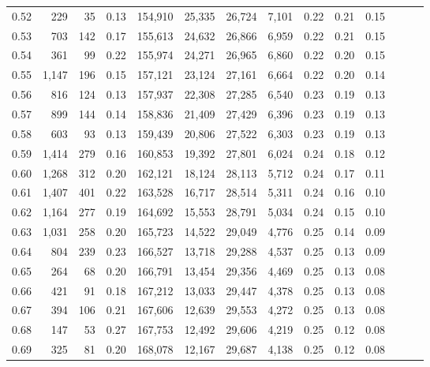 \begin{tabular}{rrrrrrrrrrrrrr}
0.52 &     229 &     35 &  0.13 &  154,910 &   25,335 &  26,724 &   7,101 &  0.22 &  0.21 &      0.15 \\
0.53 &     703 &    142 &  0.17 &  155,613 &   24,632 &  26,866 &   6,959 &  0.22 &  0.21 &      0.15 \\
0.54 &     361 &     99 &  0.22 &  155,974 &   24,271 &  26,965 &   6,860 &  0.22 &  0.20 &      0.15 \\
0.55 &   1,147 &    196 &  0.15 &  157,121 &   23,124 &  27,161 &   6,664 &  0.22 &  0.20 &      0.14 \\
0.56 &     816 &    124 &  0.13 &  157,937 &   22,308 &  27,285 &   6,540 &  0.23 &  0.19 &      0.13 \\
0.57 &     899 &    144 &  0.14 &  158,836 &   21,409 &  27,429 &   6,396 &  0.23 &  0.19 &      0.13 \\
0.58 &     603 &     93 &  0.13 &  159,439 &   20,806 &  27,522 &   6,303 &  0.23 &  0.19 &      0.13 \\
0.59 &   1,414 &    279 &  0.16 &  160,853 &   19,392 &  27,801 &   6,024 &  0.24 &  0.18 &      0.12 \\
0.60 &   1,268 &    312 &  0.20 &  162,121 &   18,124 &  28,113 &   5,712 &  0.24 &  0.17 &      0.11 \\
0.61 &   1,407 &    401 &  0.22 &  163,528 &   16,717 &  28,514 &   5,311 &  0.24 &  0.16 &      0.10 \\
0.62 &   1,164 &    277 &  0.19 &  164,692 &   15,553 &  28,791 &   5,034 &  0.24 &  0.15 &      0.10 \\
0.63 &   1,031 &    258 &  0.20 &  165,723 &   14,522 &  29,049 &   4,776 &  0.25 &  0.14 &      0.09 \\
0.64 &     804 &    239 &  0.23 &  166,527 &   13,718 &  29,288 &   4,537 &  0.25 &  0.13 &      0.09 \\
0.65 &     264 &     68 &  0.20 &  166,791 &   13,454 &  29,356 &   4,469 &  0.25 &  0.13 &      0.08 \\
0.66 &     421 &     91 &  0.18 &  167,212 &   13,033 &  29,447 &   4,378 &  0.25 &  0.13 &      0.08 \\
0.67 &     394 &    106 &  0.21 &  167,606 &   12,639 &  29,553 &   4,272 &  0.25 &  0.13 &      0.08 \\
0.68 &     147 &     53 &  0.27 &  167,753 &   12,492 &  29,606 &   4,219 &  0.25 &  0.12 &      0.08 \\
0.69 &     325 &     81 &  0.20 &  168,078 &   12,167 &  29,687 &   4,138 &  0.25 &  0.12 &      0.08 \\

\end{tabular}
